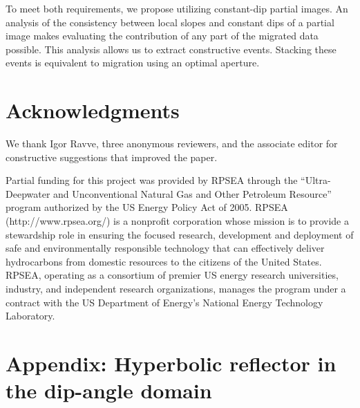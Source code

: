 To meet both requirements, we propose utilizing constant-dip partial images. An analysis of the consistency between local slopes and
constant dips of a partial image makes evaluating the contribution of any part of the migrated data possible. This analysis allows us
to extract constructive events. Stacking these events is equivalent to migration using an optimal aperture.

\section{Acknowledgments}

We thank Igor Ravve, three anonymous reviewers, and the associate editor  for constructive suggestions that improved the paper.

Partial funding for this project was provided by RPSEA through the “Ultra-Deepwater and Unconventional 
Natural Gas and Other Petroleum Resource” program authorized by the US Energy Policy Act of 2005. 
RPSEA (http://www.rpsea.org/) is a nonprofit corporation whose mission is to provide a stewardship 
role in ensuring the focused research, development and deployment of safe and environmentally
responsible technology that can effectively deliver hydrocarbons from domestic resources to the 
citizens of the United States. RPSEA, operating as a consortium of premier US energy research universities, 
industry, and independent research organizations, manages the program under a contract with the US Department 
of Energy’s National Energy Technology Laboratory.

\appendix
\section{Appendix: Hyperbolic reflector in the dip-angle domain}

